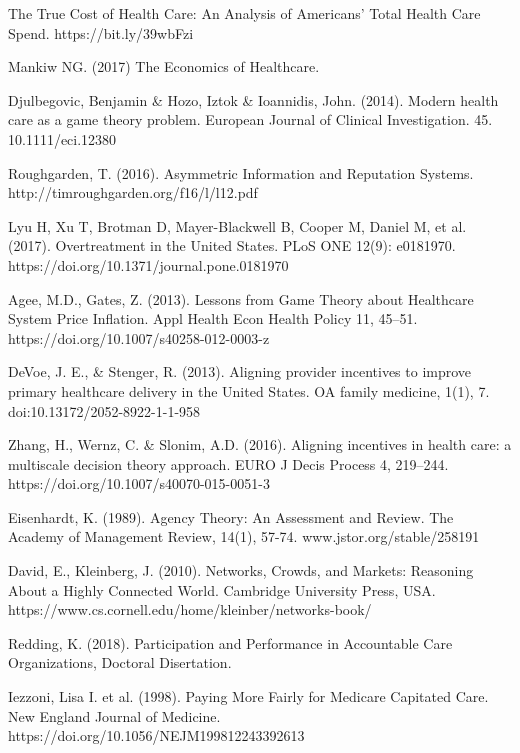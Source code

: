 \documentclass{article}
\begin{document}
\begin{thebibliography}{8}

The True Cost of Health Care: An Analysis of Americans’ Total Health Care Spend. https://bit.ly/39wbFzi

Mankiw NG. (2017) The Economics of Healthcare.

Djulbegovic, Benjamin \& Hozo, Iztok \& Ioannidis, John. (2014). Modern health care as a game theory problem. European Journal of Clinical Investigation. 45. 10.1111/eci.12380

Roughgarden, T. (2016). Asymmetric Information and Reputation Systems. http://timroughgarden.org/f16/l/l12.pdf

Lyu H, Xu T, Brotman D, Mayer-Blackwell B, Cooper M, Daniel M, et al. (2017). Overtreatment in the United States. PLoS ONE 12(9): e0181970. https://doi.org/10.1371/journal.pone.0181970

Agee, M.D., Gates, Z. (2013). Lessons from Game Theory about Healthcare System Price Inflation. Appl Health Econ Health Policy 11, 45–51. https://doi.org/10.1007/s40258-012-0003-z

DeVoe, J. E., \& Stenger, R. (2013). Aligning provider incentives to improve primary healthcare delivery in the United States. OA family medicine, 1(1), 7. doi:10.13172/2052-8922-1-1-958

Zhang, H., Wernz, C. \& Slonim, A.D. (2016). Aligning incentives in health care: a multiscale decision theory approach. EURO J Decis Process 4, 219–244. https://doi.org/10.1007/s40070-015-0051-3

Eisenhardt, K. (1989). Agency Theory: An Assessment and Review. The Academy of Management Review, 14(1), 57-74. www.jstor.org/stable/258191

David, E., Kleinberg, J. (2010). Networks, Crowds, and Markets: Reasoning About a Highly Connected World. Cambridge University Press, USA. https://www.cs.cornell.edu/home/kleinber/networks-book/

Redding, K. (2018). Participation and Performance in Accountable Care Organizations, Doctoral Disertation.

Iezzoni, Lisa I. et al. (1998). Paying More Fairly for Medicare Capitated Care. New England Journal of Medicine. https://doi.org/10.1056/NEJM199812243392613

\end{thebibliography}

\end{document}
